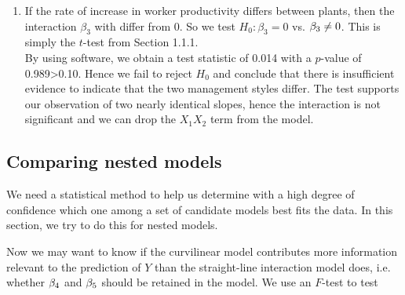 \documentclass{report}
\begin{document}
{\begin{enumerate}
		To obtain the predict equations for both plants, we substitute $X_2=0$ and $X_2=1$ and obtain
		$$\hat{Y}=1365.83+6.217X_1 \quad \text{ and }\quad \hat{Y}=1365.83+6.217X_1+47.78+0.033X_1=1413.61+6.250X_1$$
		respectively. Graphing these two lines shows that their gradients are nearly identical due to the coefficient of the $X_1X_2$ term being close to zero. However, we cannot make any conclusions before conducting a test.
		\item If the rate of increase in worker productivity differs between plants, then the interaction $\beta_3$ with differ from 0. So we test $H_0: \beta_3=0$ vs. $\beta_3\neq 0$. This is simply the $t$-test from Section 1.1.1. \\
		
		By using software, we obtain a test statistic of 0.014 with a $p$-value of 0.989>0.10. Hence we fail to reject $H_0$ and conclude that there is insufficient evidence to indicate that the two management styles differ. The test supports our observation of two nearly identical slopes, hence the interaction is not significant and we can drop the $X_1X_2$ term from the model. 
	\end{enumerate}
	}
	\subsection{Comparing nested models}
	We need a statistical method to help us determine with a high degree of confidence which one among a set of candidate models best fits the data. In this section, we try to do this for nested models.
	
	\vspace{1mm}
	\vspace{1mm}
	Now we may want to know if the curvilinear model contributes more information relevant to the prediction of $Y$ than the straight-line interaction model does, i.e. whether $\beta_4$ and $\beta_5$ should be retained in the model. We use an $F$-test to test
	
\end{document}

